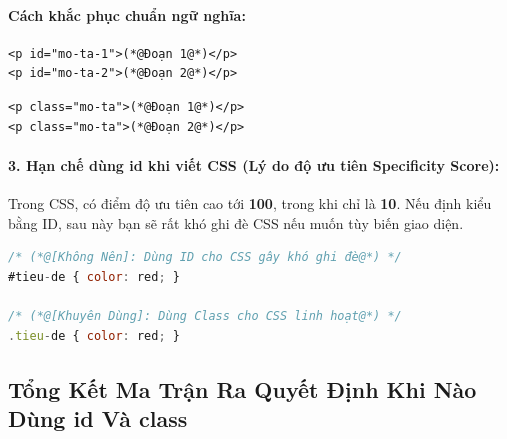 \paragraph{Cách khắc phục chuẩn ngữ nghĩa:}
\begin{codeWindow}
\begin{lstlisting}[language=HTML5]
<p id="mo-ta-1">(*@Đoạn 1@*)</p>
<p id="mo-ta-2">(*@Đoạn 2@*)</p>
\end{lstlisting}
\end{codeWindow}

\begin{codeWindow}
\begin{lstlisting}[language=HTML5]
<p class="mo-ta">(*@Đoạn 1@*)</p>
<p class="mo-ta">(*@Đoạn 2@*)</p>
\end{lstlisting}
\end{codeWindow}

\paragraph{3. Hạn chế dùng id khi viết CSS (Lý do độ ưu tiên Specificity Score):}
Trong CSS,  có điểm độ ưu tiên cao tới \textbf{100}, trong khi  chỉ là \textbf{10}. Nếu định kiểu bằng ID, sau này bạn sẽ rất khó ghi đè CSS nếu muốn tùy biến giao diện. 
\begin{codeWindow}
\begin{lstlisting}[language=JavaScript]
/* (*@[Không Nên]: Dùng ID cho CSS gây khó ghi đè@*) */
#tieu-de { color: red; }

/* (*@[Khuyên Dùng]: Dùng Class cho CSS linh hoạt@*) */
.tieu-de { color: red; }
\end{lstlisting}
\end{codeWindow}

\subsection{Tổng Kết Ma Trận Ra Quyết Định Khi Nào Dùng id Và class}

